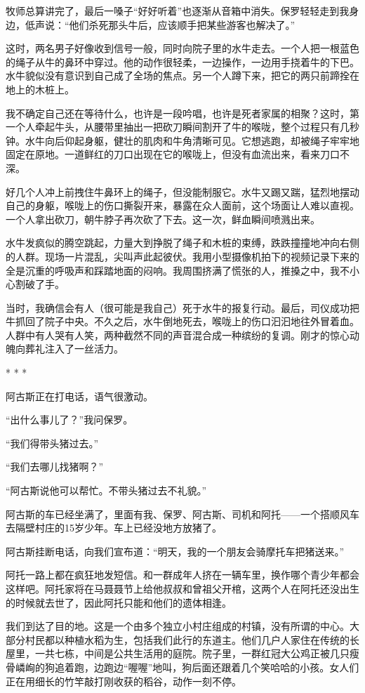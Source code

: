 \documentclass[12pt,oneside]{book}
\begin{document}
\begin{bookref}[frametitle={\cite{好好告别}}]
牧师总算讲完了，最后一嗓子“好好听着”也逐渐从音箱中消失。保罗轻轻走到我身边，低声说：“他们杀死那头牛后，应该顺手把某些游客也解决了。”

这时，两名男子好像收到信号一般，同时向院子里的水牛走去。一个人把一根蓝色的绳子从牛的鼻环中穿过。他的动作很轻柔，一边操作，一边用手挠着牛的下巴。水牛貌似没有意识到自己成了全场的焦点。另一个人蹲下来，把它的两只前蹄拴在地上的木桩上。

我不确定自己还在等待什么，也许是一段吟唱，也许是死者家属的相聚？这时，第一个人牵起牛头，从腰带里抽出一把砍刀瞬间割开了牛的喉咙，整个过程只有几秒钟。水牛向后仰起身躯，健壮的肌肉和牛角清晰可见。它想逃跑，却被绳子牢牢地固定在原地。一道鲜红的刀口出现在它的喉咙上，但没有血流出来，看来刀口不深。

好几个人冲上前拽住牛鼻环上的绳子，但没能制服它。水牛又踢又踹，猛烈地摆动自己的身躯，喉咙上的伤口撕裂开来，暴露在众人面前，这个场面让人难以直视。一个人拿出砍刀，朝牛脖子再次砍了下去。这一次，鲜血瞬间喷溅出来。

水牛发疯似的腾空跳起，力量大到挣脱了绳子和木桩的束缚，跌跌撞撞地冲向右侧的人群。现场一片混乱，尖叫声此起彼伏。我用小型摄像机拍下的视频记录下来的全是沉重的呼吸声和踩踏地面的闷响。我周围挤满了慌张的人，推搡之中，我不小心割破了手。

当时，我确信会有人（很可能是我自己）死于水牛的报复行动。最后，司仪成功把牛抓回了院子中央。不久之后，水牛倒地死去，喉咙上的伤口汩汩地往外冒着血。人群中有人哭有人笑，两种截然不同的声音混合成一种缤纷的复调。刚才的惊心动魄向葬礼注入了一丝活力。

\begin{center}
* * *
\end{center}

阿古斯正在打电话，语气很激动。

“出什么事儿了？”我问保罗。

“我们得带头猪过去。”

“我们去哪儿找猪啊？”

“阿古斯说他可以帮忙。不带头猪过去不礼貌。”

阿古斯的车已经坐满了，里面有我、保罗、阿古斯、司机和阿托——一个搭顺风车去隔壁村庄的15岁少年。车上已经没地方放猪了。

阿古斯挂断电话，向我们宣布道：“明天，我的一个朋友会骑摩托车把猪送来。”

阿托一路上都在疯狂地发短信。和一群成年人挤在一辆车里，换作哪个青少年都会这样吧。阿托家将在马聂聂节上给他叔叔和曾祖父开棺，这两个人在阿托还没出生的时候就去世了，因此阿托只能和他们的遗体相逢。

我们到达了目的地。这是一个由多个独立小村庄组成的村镇，没有所谓的中心。大部分村民都以种植水稻为生，包括我们此行的东道主。他们几户人家住在传统的长屋里，一共七栋，中间是公共生活用的庭院。院子里，一群红冠大公鸡正被几只瘦骨嶙峋的狗追着跑，边跑边“喔喔”地叫，狗后面还跟着几个笑哈哈的小孩。女人们正在用细长的竹竿敲打刚收获的稻谷，动作一刻不停。


\end{bookref}
\end{document}
